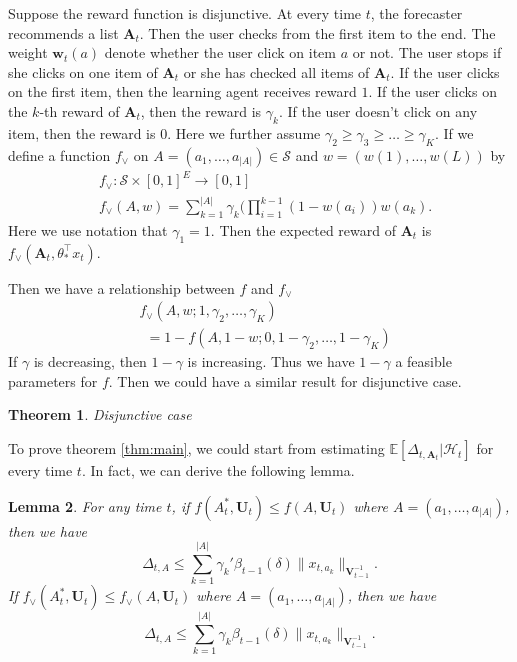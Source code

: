 \documentclass{article}
\newcommand{\EE}{\mathbb{E}}
\newcommand{\bA}{\mathbf{A}}
\newcommand{\bU}{\mathbf{U}}
\newcommand{\bV}{\mathbf{V}}
\newcommand{\bw}{\mathbf{w}}
\newcommand{\cH}{\mathcal{H}}
\newcommand{\cS}{\mathcal{S}}
\newcommand{\abs}[1]{\left| #1 \right|}
\newcommand{\norm}[1]{\| #1 \|}
\newtheorem{theorem}{Theorem}[section]
\newtheorem{lemma}[theorem]{Lemma}%
\begin{document}
Suppose the reward function is disjunctive. At every time $t$, the forecaster recommends a list $\bA_t$. Then the user checks from the first item to the end. The weight $\bw_t(a)$ denote whether the user click on item $a$ or not. The user stops if she clicks on one item of $\bA_t$ or she has checked all items of $\bA_t$. If the user clicks on the first item, then the learning agent receives reward $1$. If the user clicks on the $k$-th reward of $\bA_t$, then the reward is $\gamma_k$. If the user doesn't click on any item, then the reward is $0$. Here we further assume $\gamma_2 \geq \gamma_3 \geq \ldots \geq \gamma_K$. If we define a function $f_{\vee}$ on $A = (a_1, \ldots, a_{\abs{A}}) \in \cS$ and $w = (w(1), \ldots, w(L))$ by
\begin{align*}
&f_{\vee} : \cS \times [0,1]^E \to [0,1]\\
&f_{\vee}(A,w) = \sum_{k=1}^{\abs{A}}\gamma_k (\prod_{i=1}^{k-1} (1 - w(a_i)) w(a_k).
\end{align*}
Here we use notation that $\gamma_1 = 1$. Then the expected reward of $\bA_t$ is $f_{\vee}(\bA_t, \theta_*^{\top}x_t)$.

Then we have a relationship between $f$ and $f_{\vee}$
\begin{equation}
\label{eq:relation}
\begin{split}
&f_{\vee}(A, w; 1, \gamma_2, \ldots, \gamma_K) \\
&~~= 1 - f(A, 1 - w; 0, 1-\gamma_2, \ldots, 1-\gamma_K)
\end{split}
\end{equation}
If $\gamma$ is decreasing, then $1 - \gamma$ is increasing. Thus we have $1 - \gamma$ a feasible parameters for $f$. Then we could have a similar result for disjunctive case.
\begin{theorem}
Disjunctive case
\end{theorem}

To prove theorem \ref{thm:main}, we could start from estimating $\EE[\Delta_{t, \bA_t}|\cH_t]$ for every time $t$. In fact, we can derive the following lemma.
\begin{lemma}
\label{lem:DeltaEstimate}
For any time $t$, if $f(A_t^*, \bU_t) \leq f(A, \bU_t)$ where $A = (a_1, \ldots, a_{\abs{A}})$, then we have
$$
\Delta_{t,A} \leq \sum_{k=1}^{\abs{A}} \gamma_k' \beta_{t-1}(\delta)\norm{x_{t,a_k}}_{\bV_{t-1}^{-1}}.
$$
If $f_{\vee}(A_t^*, \bU_t) \leq f_{\vee}(A, \bU_t)$ where $A = (a_1, \ldots, a_{\abs{A}})$, then we have
$$
\Delta_{t,A} \leq \sum_{k=1}^{\abs{A}} \gamma_k \beta_{t-1}(\delta)\norm{x_{t,a_k}}_{\bV_{t-1}^{-1}}.
$$
\end{lemma}
\end{document}
